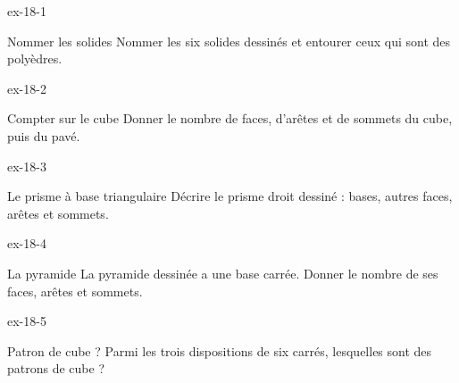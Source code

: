 \clearpage{}
\begin{blocLivre}{ex-18-1}\begin{exercice}[1]{Nommer les solides}
Nommer les six solides dessinés et entourer ceux qui sont des polyèdres.
\label{fig-ex-18-1}
\end{exercice}\end{blocLivre}
\begin{blocLivre}{ex-18-2}\begin{exercice}[1]{Compter sur le cube}
Donner le nombre de faces, d’arêtes et de sommets du cube, puis du pavé.
\label{fig-ex-18-2}
\end{exercice}\end{blocLivre}
\begin{blocLivre}{ex-18-3}\begin{exercice}[1]{Le prisme à base triangulaire}
Décrire le prisme droit dessiné : bases, autres faces, arêtes et sommets.
\label{fig-ex-18-3}
\end{exercice}\end{blocLivre}
\begin{blocLivre}{ex-18-4}\begin{exercice}[1]{La pyramide}
La pyramide dessinée a une base carrée. Donner le nombre de ses faces, arêtes et sommets.
\label{fig-ex-18-4}
\end{exercice}\end{blocLivre}
\begin{blocLivre}{ex-18-5}\begin{exercice}[1]{Patron de cube ?}
Parmi les trois dispositions de six carrés, lesquelles sont des patrons de cube ?
\label{fig-ex-18-5}
\end{exercice}\end{blocLivre}

